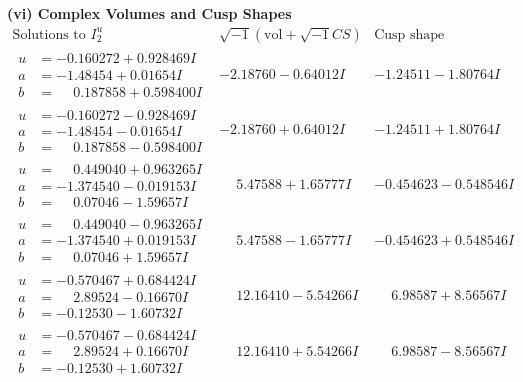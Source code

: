 \documentclass[1p]{elsarticle_modified}
\theoremstyle{definition}
\newcommand{\I}{\sqrt{-1}}
\begin{document}
\newpage\flushleft \textbf{(vi) Complex Volumes and Cusp Shapes}
$$\begin{array}{c|c|c}  
\text{Solutions to }I^u_{2}& \I (\text{vol} + \sqrt{-1}CS) & \text{Cusp shape}\\
 \hline 
\begin{aligned}
u &= -0.160272 + 0.928469 I \\
a &= -1.48454 + 0.01654 I \\
b &= \phantom{-}0.187858 + 0.598400 I\end{aligned}
 & -2.18760 - 0.64012 I & -1.24511 - 1.80764 I \\ \hline\begin{aligned}
u &= -0.160272 - 0.928469 I \\
a &= -1.48454 - 0.01654 I \\
b &= \phantom{-}0.187858 - 0.598400 I\end{aligned}
 & -2.18760 + 0.64012 I & -1.24511 + 1.80764 I \\ \hline\begin{aligned}
u &= \phantom{-}0.449040 + 0.963265 I \\
a &= -1.374540 - 0.019153 I \\
b &= \phantom{-}0.07046 - 1.59657 I\end{aligned}
 & \phantom{-}5.47588 + 1.65777 I & -0.454623 - 0.548546 I \\ \hline\begin{aligned}
u &= \phantom{-}0.449040 - 0.963265 I \\
a &= -1.374540 + 0.019153 I \\
b &= \phantom{-}0.07046 + 1.59657 I\end{aligned}
 & \phantom{-}5.47588 - 1.65777 I & -0.454623 + 0.548546 I \\ \hline\begin{aligned}
u &= -0.570467 + 0.684424 I \\
a &= \phantom{-}2.89524 - 0.16670 I \\
b &= -0.12530 - 1.60732 I\end{aligned}
 & \phantom{-}12.16410 - 5.54266 I & \phantom{-}6.98587 + 8.56567 I \\ \hline\begin{aligned}
u &= -0.570467 - 0.684424 I \\
a &= \phantom{-}2.89524 + 0.16670 I \\
b &= -0.12530 + 1.60732 I\end{aligned}
 & \phantom{-}12.16410 + 5.54266 I & \phantom{-}6.98587 - 8.56567 I \\ \hline\begin{aligned}

\end{aligned}
\end{array}$$
\end{document}

